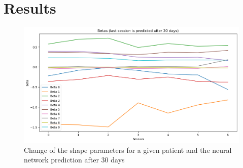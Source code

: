 \section{Results}

\begin{figure}[h]
    \centering
    \includegraphics[width=\textwidth]{files/predicted_betas}
    \caption{Change of the shape parameters for a given patient and the neural
        network prediction after 30 days}
\end{figure}